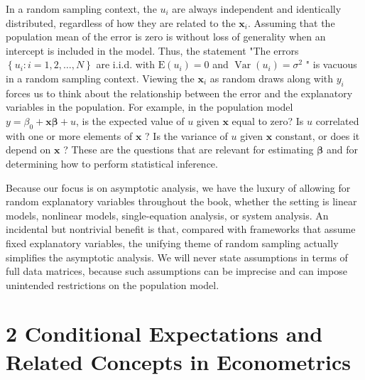 \documentclass[10pt]{article}
\begin{document}
In a random sampling context, the $u_{i}$ are always independent and identically distributed, regardless of how they are related to the $\mathbf{x}_{i}$. Assuming that the population mean of the error is zero is without loss of generality when an intercept is included in the model. Thus, the statement "The errors $\left\{u_{i}: i=1,2, \ldots, N\right\}$ are i.i.d. with $\mathrm{E}\left(u_{i}\right)=0$ and $\operatorname{Var}\left(u_{i}\right)=\sigma^{2}$ " is vacuous in a random sampling context. Viewing the $\mathbf{x}_{i}$ as random draws along with $y_{i}$ forces us to think about the relationship between the error and the explanatory variables in the population. For example, in the population model $y=\beta_{0}+\mathbf{x} \boldsymbol{\beta}+u$, is the expected value of $u$ given $\mathbf{x}$ equal to zero? Is $u$ correlated with one or more elements of $\mathbf{x}$ ? Is the variance of $u$ given $\mathbf{x}$ constant, or does it depend on $\mathbf{x}$ ? These are the questions that are relevant for estimating $\boldsymbol{\beta}$ and for determining how to perform statistical inference.

Because our focus is on asymptotic analysis, we have the luxury of allowing for random explanatory variables throughout the book, whether the setting is linear models, nonlinear models, single-equation analysis, or system analysis. An incidental but nontrivial benefit is that, compared with frameworks that assume fixed explanatory variables, the unifying theme of random sampling actually simplifies the asymptotic analysis. We will never state assumptions in terms of full data matrices, because such assumptions can be imprecise and can impose unintended restrictions on the population model.

\section*{2 Conditional Expectations and Related Concepts in Econometrics}
\end{document}
